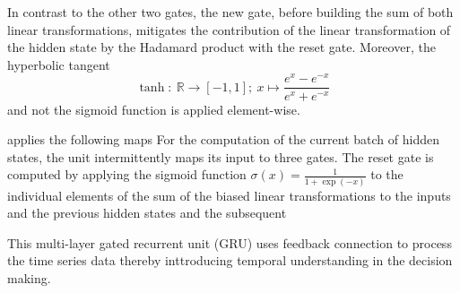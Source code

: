 In contrast to the other two gates,
the new gate, before building the sum of both linear transformations,
mitigates the contribution of the linear transformation of the 
hidden state by the Hadamard product with the reset gate.
Moreover, the hyperbolic tangent \cite{D.1966}
\begin{equation}
    \tanh
    :\ 
    \mathbb{R}
    \rightarrow
    \left[
        -1,1
    \right]
    ;\ 
    x 
    \mapsto 
    \frac{
        e^x - e^{-x}
    }{
        e^x + e^{-x}
    }
\end{equation}
and not the sigmoid function 
is applied element-wise.



applies the following maps
For the computation of the current batch of hidden states,
the unit intermittently maps its input to three gates.
The reset gate is computed by 
applying the sigmoid function
$
\sigma(x) = \frac{1}{1+\exp(-x)}
$
to the individual elements of the sum
of the biased linear transformations
to the inputs and the previous hidden states
and the subsequent


This multi-layer gated recurrent unit (GRU)
uses feedback connection to process the time series data
thereby inttroducing temporal understanding in the decision making.



